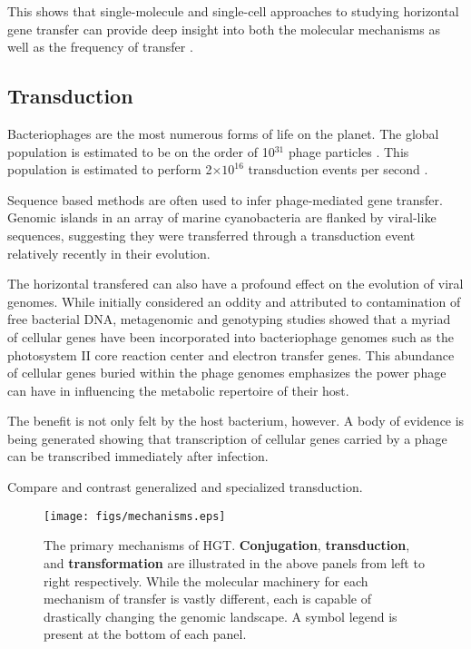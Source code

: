 This shows that single-molecule and single-cell approaches to studying
horizontal gene transfer can provide deep insight into both the molecular
mechanisms as well as the frequency of transfer \cite{Babic:2008bl}.


\subsection*{Transduction}
Bacteriophages are the most numerous forms of life on the planet. The global
population is estimated to be on the order of 10$^{31}$ phage
particles \cite{Comeau:2008jo}. This population is estimated to perform 2$\times
10^{16}$ transduction events per second \cite{ChibaniChennoufi:2004gv}.


Sequence based methods are often used to infer phage-mediated gene transfer.
Genomic islands in an array of marine cyanobacteria are flanked by viral-like
sequences, suggesting they were transferred through a transduction event
relatively recently in their evolution\cite{Anonymous:2004vg, Palenik:2003ef}.

The horizontal transfered can also have a profound effect on the evolution of
viral genomes. While initially considered an oddity and attributed to
contamination of free bacterial DNA, metagenomic and genotyping studies showed
that a myriad of cellular genes have been incorporated into bacteriophage
genomes such as the photosystem II core reaction center and electron transfer
genes\cite{Anonymous:2004vg,Comeau:2008jo}.  This abundance of cellular genes
buried within the phage genomes emphasizes the power phage can have in
influencing the metabolic repertoire of their host. 

The benefit is not only felt by the host bacterium, however. A body of evidence
is being generated showing that transcription of cellular genes carried by a
phage can be transcribed immediately after infection. 

Compare and contrast generalized and specialized transduction.

\begin{figure}
\centerline{\texttt{[image: figs/mechanisms.eps]}}
\caption{The primary mechanisms of HGT. \textbf{Conjugation},
\textbf{transduction}, and \textbf{transformation} are illustrated in the above
panels from left to right respectively. While the molecular machinery for each
mechanism of transfer is vastly different, each is capable of drastically
changing the genomic landscape. A symbol legend is present at the bottom of each panel.}

\label{fig:mechanisms}
\end{figure}
